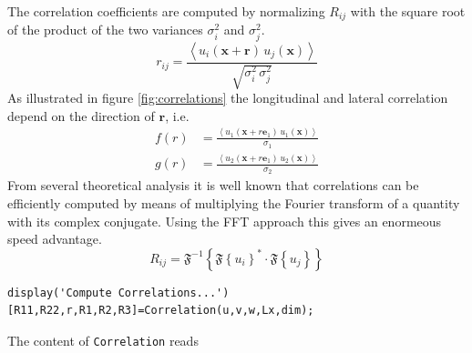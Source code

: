\documentclass[preprint,12pt,ntfdMod]{elsarticle}
\begin{document}
\begin{par}
\begin{equation}
  \end{equation}
The correlation coefficients are computed by normalizing
$R_{ij}$ with the square root of the product of the two variances
$\sigma_i^2$ and $\sigma_j^2$.
  \begin{equation}
      r_{ij} = \frac{\left<u_i(\mathbf{x}+\mathbf{r})\,u_j(\mathbf{x})\right>}
                  {\sqrt{\sigma_i^2\,\sigma_j^2}}
  \end{equation}
As illustrated in figure \ref{fig:correlations} the longitudinal and lateral
correlation depend on the direction of $\mathbf{r}$, i.e.
  \begin{eqnarray}
      f(r) &= \displaystyle\frac{\left<u_1(\mathbf{x}+r\mathbf{e}_1)\,u_1(\mathbf{x})\right>}
                  {\sigma_1}\\
      g(r) &= \displaystyle\frac{\left<u_2(\mathbf{x}+r\mathbf{e}_1)\,u_2(\mathbf{x})\right>}
                  {\sigma_2}
  \end{eqnarray}
From several theoretical analysis it is well known that correlations can
be efficiently computed by means of multiplying the Fourier transform of
a quantity with its complex conjugate. Using the FFT approach this gives
an enormeous speed advantage.
  \begin{equation}
      R_{ij} =
      \mathfrak{F}^{-1}\left\{\mathfrak{F}\left\{u_i\right\}^*\cdot\mathfrak{F}\left\{u_j\right\}\right\}
  \end{equation}

\end{par} \vspace{1em}
\begin{verbatim}
display('Compute Correlations...')
[R11,R22,r,R1,R2,R3]=Correlation(u,v,w,Lx,dim);
\end{verbatim}
\begin{par}

The content of \verb|Correlation| reads


\end{par} \vspace{1em}
\begin{par}




\end{par} \vspace{1em}
\end{document}
